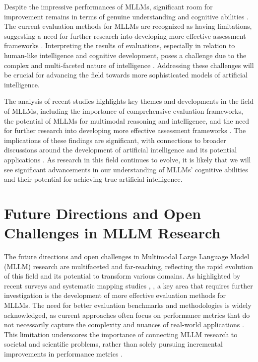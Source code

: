 \documentclass[conference]{IEEEtran}
\begin{document}
Despite the impressive performances of MLLMs, significant room for improvement remains in terms of genuine understanding and cognitive abilities \cite{b11}. The current evaluation methods for MLLMs are recognized as having limitations, suggesting a need for further research into developing more effective assessment frameworks \cite{b12}. Interpreting the results of evaluations, especially in relation to human-like intelligence and cognitive development, poses a challenge due to the complex and multi-faceted nature of intelligence \cite{b13}. Addressing these challenges will be crucial for advancing the field towards more sophisticated models of artificial intelligence.

The analysis of recent studies highlights key themes and developments in the field of MLLMs, including the importance of comprehensive evaluation frameworks, the potential of MLLMs for multimodal reasoning and intelligence, and the need for further research into developing more effective assessment frameworks \cite{b14}. The implications of these findings are significant, with connections to broader discussions around the development of artificial intelligence and its potential applications \cite{b15}. As research in this field continues to evolve, it is likely that we will see significant advancements in our understanding of MLLMs' cognitive abilities and their potential for achieving true artificial intelligence.

\section{Future Directions and Open Challenges in MLLM Research}
The future directions and open challenges in Multimodal Large Language Model (MLLM) research are multifaceted and far-reaching, reflecting the rapid evolution of this field and its potential to transform various domains. As highlighted by recent surveys and systematic mapping studies \cite{b1}, \cite{b2}, a key area that requires further investigation is the development of more effective evaluation methods for MLLMs. The need for better evaluation benchmarks and methodologies is widely acknowledged, as current approaches often focus on performance metrics that do not necessarily capture the complexity and nuances of real-world applications \cite{b3}. This limitation underscores the importance of connecting MLLM research to societal and scientific problems, rather than solely pursuing incremental improvements in performance metrics \cite{b4}.
\end{document}
